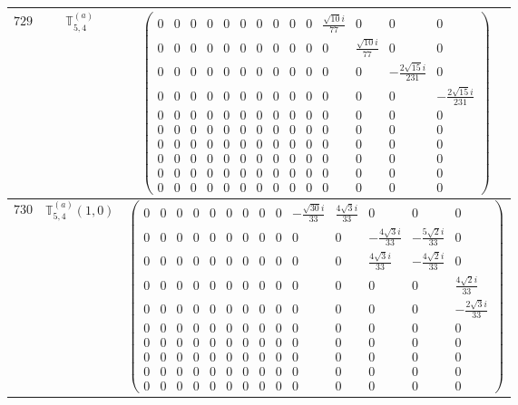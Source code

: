 \documentclass[fleqn,8pt,landscape]{jsarticle}
\begin{document}
\begin{center}
\begin{longtable}{ccc}
$ 729 $ & $ \mathbb{T}_{5,4}^{(a)} $ & $ \begin{pmatrix} 0 & 0 & 0 & 0 & 0 & 0 & 0 & 0 & 0 & 0 & \frac{\sqrt{10} i}{77} & 0 & 0 & 0 \\ 0 & 0 & 0 & 0 & 0 & 0 & 0 & 0 & 0 & 0 & 0 & \frac{\sqrt{10} i}{77} & 0 & 0 \\ 0 & 0 & 0 & 0 & 0 & 0 & 0 & 0 & 0 & 0 & 0 & 0 & - \frac{2 \sqrt{15} i}{231} & 0 \\ 0 & 0 & 0 & 0 & 0 & 0 & 0 & 0 & 0 & 0 & 0 & 0 & 0 & - \frac{2 \sqrt{15} i}{231} \\ 0 & 0 & 0 & 0 & 0 & 0 & 0 & 0 & 0 & 0 & 0 & 0 & 0 & 0 \\ 0 & 0 & 0 & 0 & 0 & 0 & 0 & 0 & 0 & 0 & 0 & 0 & 0 & 0 \\ 0 & 0 & 0 & 0 & 0 & 0 & 0 & 0 & 0 & 0 & 0 & 0 & 0 & 0 \\ 0 & 0 & 0 & 0 & 0 & 0 & 0 & 0 & 0 & 0 & 0 & 0 & 0 & 0 \\ 0 & 0 & 0 & 0 & 0 & 0 & 0 & 0 & 0 & 0 & 0 & 0 & 0 & 0 \\ 0 & 0 & 0 & 0 & 0 & 0 & 0 & 0 & 0 & 0 & 0 & 0 & 0 & 0 \end{pmatrix} $ \\ \hline
$ 730 $ & $ \mathbb{T}_{5,4}^{(a)}(1,0) $ & $ \begin{pmatrix} 0 & 0 & 0 & 0 & 0 & 0 & 0 & 0 & 0 & - \frac{\sqrt{30} i}{33} & \frac{4 \sqrt{3} i}{33} & 0 & 0 & 0 \\ 0 & 0 & 0 & 0 & 0 & 0 & 0 & 0 & 0 & 0 & 0 & - \frac{4 \sqrt{3} i}{33} & - \frac{5 \sqrt{2} i}{33} & 0 \\ 0 & 0 & 0 & 0 & 0 & 0 & 0 & 0 & 0 & 0 & 0 & \frac{4 \sqrt{3} i}{33} & - \frac{4 \sqrt{2} i}{33} & 0 \\ 0 & 0 & 0 & 0 & 0 & 0 & 0 & 0 & 0 & 0 & 0 & 0 & 0 & \frac{4 \sqrt{2} i}{33} \\ 0 & 0 & 0 & 0 & 0 & 0 & 0 & 0 & 0 & 0 & 0 & 0 & 0 & - \frac{2 \sqrt{3} i}{33} \\ 0 & 0 & 0 & 0 & 0 & 0 & 0 & 0 & 0 & 0 & 0 & 0 & 0 & 0 \\ 0 & 0 & 0 & 0 & 0 & 0 & 0 & 0 & 0 & 0 & 0 & 0 & 0 & 0 \\ 0 & 0 & 0 & 0 & 0 & 0 & 0 & 0 & 0 & 0 & 0 & 0 & 0 & 0 \\ 0 & 0 & 0 & 0 & 0 & 0 & 0 & 0 & 0 & 0 & 0 & 0 & 0 & 0 \\ 0 & 0 & 0 & 0 & 0 & 0 & 0 & 0 & 0 & 0 & 0 & 0 & 0 & 0 \end{pmatrix} $ \\ \hline

\end{longtable}
\end{center}
\end{document}
